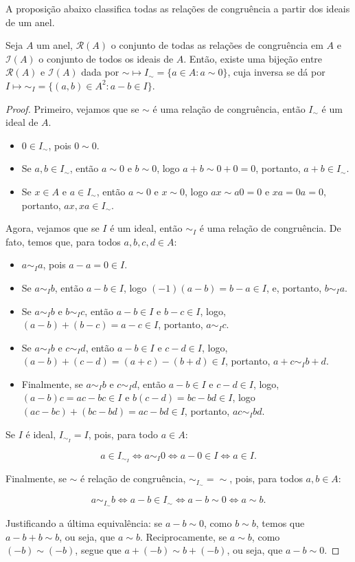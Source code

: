 A proposição abaixo classifica todas as relações de congruência a partir dos ideais de um anel.
\begin{prop}
    Seja $A$ um anel, $\mathcal R(A)$ o conjunto de todas as relações de congruência em $A$ e $\mathcal I(A)$ o conjunto de todos os ideais de $A$.
    Então, existe uma bijeção entre $\mathcal R(A)$ e $\mathcal I(A)$ dada por
    $\sim \mapsto I_{\sim}=\{a \in A: a\sim 0\}$,
    cuja inversa se dá por $I\mapsto \sim_I=\{(a, b) \in A^2: a-b \in I\}$.
\end{prop}
\begin{proof}
Primeiro, vejamos que se $\sim$ é uma relação de congruência, então $I_\sim$ é um ideal de $A$.

\begin{itemize}
\item $0 \in I_\sim$, pois $0\sim 0$.
\item Se $a, b \in I_\sim$, então $a\sim 0$ e $b\sim 0$, logo $a+b\sim 0+0=0$, portanto, $a+b \in I_\sim$.
\item Se $x \in A$ e $a \in I_\sim$, então $a\sim 0$ e $x\sim 0$, logo $ax\sim a0=0$ e $xa=0a=0$, portanto, $ax, xa \in I_\sim$.
\end{itemize}

Agora, vejamos que se $I$ é um ideal, então $\sim_I$ é uma relação de congruência. De fato, temos que, para todos $a, b, c, d \in A$:
\begin{itemize}
    \item $a\sim_I a$, pois $a-a=0\in I$.
    \item Se $a\sim_I b$, então $a-b \in I$, logo $(-1)(a-b)=b-a\in I$, e, portanto, $b\sim_I a$.
    \item Se $a\sim_I b$ e $b\sim_I c$, então $a-b \in I$ e $b-c \in I$, logo, $(a-b)+(b-c)=a-c \in I$, portanto, $a\sim_I c$.
    \item Se $a\sim_I b$ e $c\sim_I d$, então $a-b \in I$ e $c-d \in I$, logo, $(a-b)+(c-d)=(a+c)-(b+d)\in I$, portanto, $a+c\sim_I b+d$.
    \item Finalmente, se $a\sim_I b$ e $c\sim_I d$, então $a-b \in I$ e $c-d \in I$, logo, $(a-b)c=ac-bc\in I$ e $b(c-d)=bc-bd\in I$, logo $(ac-bc)+(bc-bd)=ac-bd\in I$, portanto, $ac\sim_I bd$.
    \end{itemize}

Se $I$ é ideal, $I_{\sim_I}=I$, pois, para todo $a\in A$:

$$a\in I_{\sim_I}\Leftrightarrow a\sim_I 0\Leftrightarrow a-0\in I\Leftrightarrow a\in I.$$

Finalmente, se $\sim$ é relação de congruência, $\sim_{I_\sim}=\sim$, pois, para todos $a, b \in A$:

$$a\sim_{I_\sim} b\Leftrightarrow a-b\in I_\sim \Leftrightarrow a-b\sim 0\Leftrightarrow a\sim b.$$

Justificando a última equivalência: se $a-b\sim 0$, como $b\sim b$, temos que $a-b+b\sim b$, ou seja, que $a\sim b$. Reciprocamente, se $a\sim b$, como $(-b)\sim (-b)$, segue que $a+(-b)\sim b+(-b)$, ou seja, que $a-b\sim 0$.
\end{proof}

